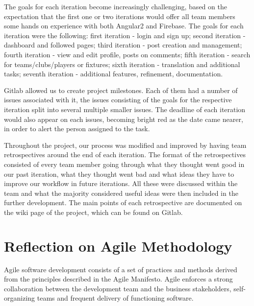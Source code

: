 \documentclass{l3proj}
\begin{document}
The goals for each iteration become increasingly challenging, based on the
 expectation that the first one or two iterations would offer all team
 members some hands on experience with both Angular2 and Firebase. The
 goals for each iteration were the following: first iteration - login
 and sign up; second iteration - dashboard and followed pages;
 third iteration - post creation and management; fourth iteration -
 view and edit profile, posts on comments; fifth iteration - search for
 teams/clubs/players or fixtures; sixth iteration - translation and
 additional tasks; seventh iteration - additional features, refinement,
 documentation.



Gitlab allowed us to create project milestones. Each of them had a number
 of issues associated with it, the issues consisting of the goals for the
 respective iteration split into several multiple smaller issues. The deadline
 of each iteration would also appear on each issues, becoming bright red as the
 date came nearer, in order to alert the person assigned to the task.

Throughout the project, our process was modified and improved by having team
 retrospectives around the end of each iteration. The format of the retrospectives
 consisted of every team member going through what they thought went good in
 our past iteration, what they thought went bad and what ideas they have to
 improve our workflow in future iterations. All these were discussed within
 the team and what the majority considered useful ideas were then included
 in the further development. The main points of each retrospective are
 documented on the wiki page of the project, which can be found on Gitlab.

\section{Reflection on Agile Methodology}
\label{sec:agile}


Agile software development consists of a set of practices and methods derived
 from the principles described in the Agile Manifesto. Agile enforces a strong
 collaboration between the development team and the business stakeholders,
 self-organizing teams and frequent delivery of functioning
 software\cite{agile_overview}.
\end{document}
